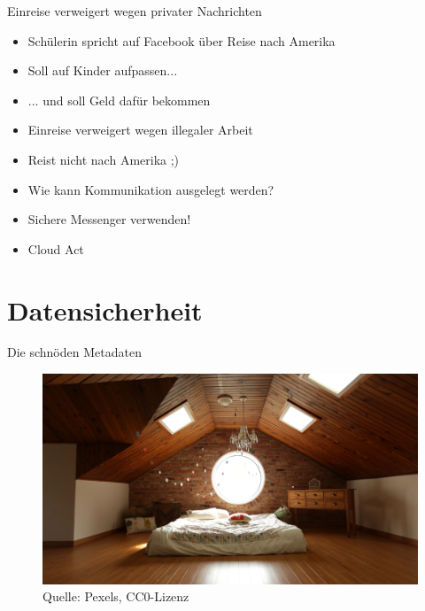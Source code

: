 \documentclass[10pt]{beamer}
\begin{document}
\begin{frame}[fragile]{Einreise verweigert wegen privater Nachrichten}
\begin{itemize}
    \item Schülerin spricht auf Facebook über Reise nach Amerika
    \item Soll auf Kinder aufpassen...
    \item ... und soll Geld dafür bekommen
    \item Einreise verweigert wegen illegaler Arbeit
    \item \alert{Reist nicht nach Amerika ;)}
    \item \alert{Wie kann Kommunikation ausgelegt werden?}
    \item \alert{Sichere Messenger verwenden!}
    \item \alert{Cloud Act}
  \end{itemize}
\end{frame}


\section{Datensicherheit}

%
%
\begin{frame}[fragile]{Die schnöden Metadaten}
	\begin{figure}
		\includegraphics[width=1\textwidth]{images/CMS_Methodensammlung_Metadaten}
			\tiny Quelle: Pexels, CC0-Lizenz
	\end{figure}
\end{frame}
\end{document}
